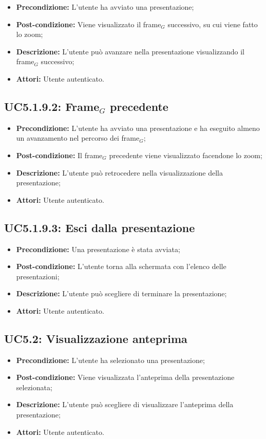 \begin{itemize}
	\item \textbf{Precondizione:} L'utente ha avviato una presentazione;
	\item \textbf{Post-condizione:} Viene visualizzato il frame$_G$ successivo, su cui viene fatto lo zoom;
	\item \textbf{Descrizione:} L'utente può avanzare nella presentazione visualizzando il frame$_G$ successivo;
	\item \textbf{Attori:} Utente autenticato.
\end{itemize}
\subsection{ UC5.1.9.2: Frame$_G$ precedente}

\begin{itemize}
	\item \textbf{Precondizione:} L'utente ha avviato una presentazione e ha eseguito almeno un avanzamento nel percorso dei frame$_G$;
	\item \textbf{Post-condizione:} Il frame$_G$ precedente viene visualizzato facendone lo zoom;
	\item \textbf{Descrizione:} L'utente può retrocedere nella visualizzazione della presentazione;
	\item \textbf{Attori:} Utente autenticato.
\end{itemize}
\subsection{ UC5.1.9.3: Esci dalla presentazione }

\begin{itemize}
	\item \textbf{Precondizione:} Una presentazione è stata avviata;
	\item \textbf{Post-condizione:} L'utente torna alla schermata con l'elenco delle presentazioni;
	\item \textbf{Descrizione:} L'utente può scegliere di terminare la presentazione;
	\item \textbf{Attori:} Utente autenticato.
\end{itemize}
\subsection{ UC5.2: Visualizzazione anteprima }

\begin{itemize}
	\item \textbf{Precondizione:} L'utente ha selezionato una presentazione;
	\item \textbf{Post-condizione:} Viene visualizzata l'anteprima della presentazione selezionata;
	\item \textbf{Descrizione:} L'utente può scegliere di visualizzare l'anteprima della presentazione;
	\item \textbf{Attori:} Utente autenticato.
\end{itemize}

